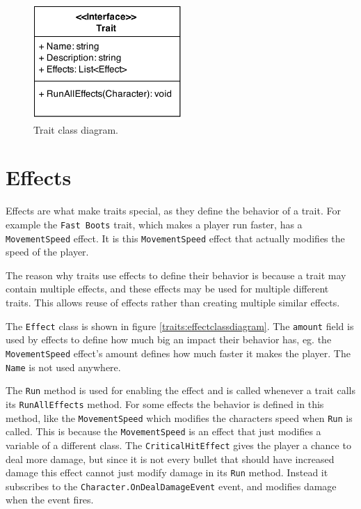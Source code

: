 \begin{figure}[H]
\centering
\includegraphics[width=0.5\textwidth]{figures/traits/TraitClassDiagram.png}
\caption{Trait class diagram.}
\label{traits:traitclassdiagram}
\end{figure}

\section{Effects}
\label{sec:modules:effects}

Effects are what make traits special, as they define the behavior of a trait.
For example the \texttt{Fast Boots} trait, which makes a player run faster, has a \texttt{MovementSpeed} effect.
It is this \texttt{MovementSpeed} effect that actually modifies the speed of the player.

The reason why traits use effects to define their behavior is because a trait may contain multiple effects, and these effects may be used for multiple different traits.
This allows reuse of effects rather than creating multiple similar effects.

The \texttt{Effect} class is shown in figure \ref{traits:effectclassdiagram}.
The \texttt{amount} field is used by effects to define how much big an impact their behavior has, eg. the \texttt{MovementSpeed} effect's amount defines how much faster it makes the player.
The \texttt{Name} is not used anywhere.

The \texttt{Run} method is used for enabling the effect and is called whenever a trait calls its \texttt{RunAllEffects} method.
For some effects the behavior is defined in this method, like the \texttt{MovementSpeed} which modifies the characters speed when \texttt{Run} is called.
This is because the \texttt{MovementSpeed} is an effect that just modifies a variable of a different class.
The \texttt{CriticalHitEffect} gives the player a chance to deal more damage, but since it is not every bullet that should have increased damage this effect cannot just modify damage in its \texttt{Run} method.
Instead it subscribes to the \texttt{Character.OnDealDamageEvent} event, and modifies damage when the event fires.

